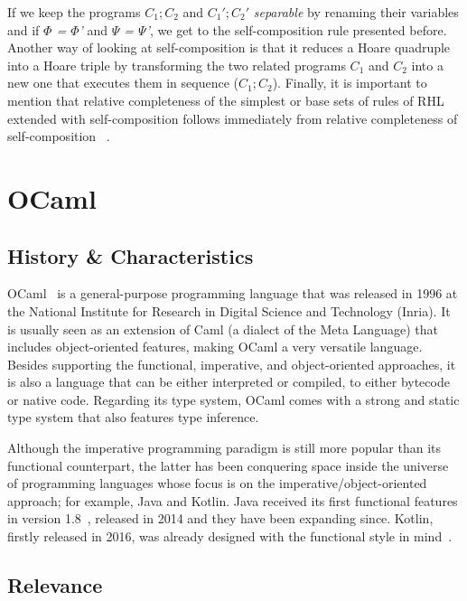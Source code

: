 If we keep the programs \emph{$C_1;C_2$} and \emph{$C_1';C_2'$} \emph{separable} by renaming their variables and if \emph{$\Phi$ = $\Phi$'} and \emph{$\Psi$ = $\Psi$'}, we get to the self-composition rule presented before.
Another way of looking at self-composition is that it reduces a Hoare quadruple into a Hoare triple by transforming the two related programs \emph{$C_1$} and \emph{$C_2$} into a new one that executes them in sequence (\emph{$C_1; C_2$}).
Finally, it is important to mention that relative completeness of the simplest or base sets of rules of RHL extended with self-composition follows immediately from relative completeness of self-composition ~\cite{DBLP:journals/jlp/BartheCK16}.


\section{OCaml}
\label{sec:ocaml}

\subsection{History \& Characteristics} 
\label{sub:overview}

OCaml~\cite{ocaml} is a general-purpose programming language that was released in 1996 at the National Institute for Research in Digital Science and Technology (Inria).
It is usually seen as an extension of Caml (a dialect of the Meta Language) that includes object-oriented features, making OCaml a very versatile language.
Besides supporting the functional, imperative, and object-oriented approaches, it is also a language that can be either interpreted or compiled, to either bytecode or native code.
Regarding its type system, OCaml comes with a strong and static type system that also features type inference.

Although the imperative programming paradigm is still more popular than its functional counterpart, the latter has been conquering space inside the universe of programming languages whose focus is on the imperative/object-oriented approach; for example, Java and Kotlin.
Java received its first functional features in version 1.8~\cite{java}, released in 2014 and they have been expanding since.
Kotlin, firstly released in 2016, was already designed with the functional style in mind~\cite{kotlin}.


\subsection{Relevance} 
\label{sub:relevance}

